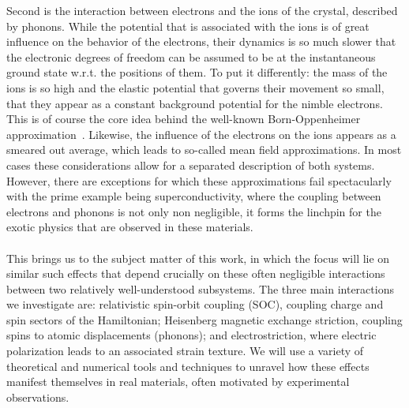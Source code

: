 Second is the interaction between electrons and the ions of the crystal, described by phonons.
While the potential that is associated with the ions is of great influence on the behavior of the electrons, their dynamics is so much slower that the electronic degrees of freedom can be assumed to be at the instantaneous ground state w.r.t. the positions of them.
To put it differently: the mass of the ions is so high and the elastic potential that governs their movement so small, that they appear as a constant background potential for the nimble electrons.
This is of course the core idea behind the well-known Born-Oppenheimer approximation~\cite{Born1927}.
Likewise, the influence of the electrons on the ions appears as a smeared out average, which leads to so-called mean field approximations.
In most cases these considerations allow for a separated description of both systems.
However, there are exceptions for which these approximations fail spectacularly with the prime example being superconductivity, where the coupling between electrons and phonons is not only non negligible, it forms the linchpin for the exotic physics that are observed in these materials.
\\\\
This brings us to the subject matter of this work, in which the focus will lie on similar such effects that depend crucially on these often negligible interactions between two relatively well-understood subsystems.
The three main interactions we investigate are: relativistic spin-orbit coupling (SOC), coupling charge and spin sectors of the Hamiltonian; Heisenberg magnetic exchange striction, coupling spins to atomic displacements (phonons); and electrostriction, where electric polarization leads to an associated strain texture.
We will use a variety of theoretical and numerical tools and techniques to unravel how these effects manifest themselves in real materials, often motivated by experimental observations.


